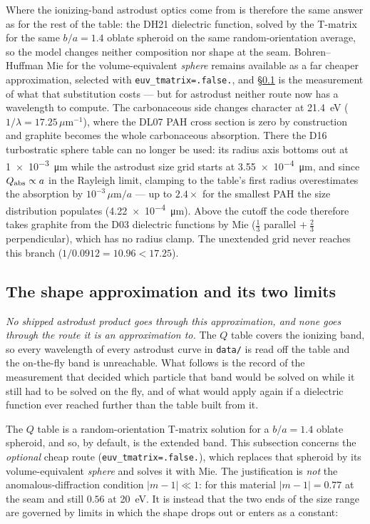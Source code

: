 \documentclass{my_memo}
\begin{document}
\medskip
\noindent Where the ionizing-band astrodust optics come from is therefore the
same answer as for the rest of the table: the DH21 dielectric function,
solved by the T-matrix for the same $b/a = 1.4$ oblate spheroid on the
same random-orientation average, so the model changes neither
composition nor shape at the seam. Bohren--Huffman Mie for the
volume-equivalent \emph{sphere} remains available as a far cheaper
approximation, selected with \texttt{euv\_tmatrix=.false.}, and
\S\ref{sec:euv-shape} is the measurement of what that substitution
costs --- but for astrodust neither route now has a wavelength to
compute. The carbonaceous
side changes character at \SI{21.4}{\electronvolt}
($1/\lambda = 17.25\,\mu\mathrm{m}^{-1}$), where the DL07 PAH cross
section is zero by construction and graphite becomes the whole
carbonaceous absorption. There the D16 turbostratic sphere table can no
longer be used: its radius axis bottoms out at
\SI{1e-3}{\micro\meter} while the astrodust size grid starts at
\SI{3.55e-4}{\micro\meter}, and since $Q_{\rm abs}\propto a$ in the
Rayleigh limit, clamping to the table's first radius overestimates the
absorption by $10^{-3}\,\mu\mathrm{m}/a$ --- up to $2.4\times$ for the
smallest PAH the size distribution populates
(\SI{4.22e-4}{\micro\meter}). Above the cutoff the code therefore takes
graphite from the D03 dielectric functions by Mie
($\tfrac13$ parallel $+\ \tfrac23$ perpendicular), which has no radius
clamp. The unextended grid never reaches this branch
($1/0.0912 = 10.96 < 17.25$).

\subsection{The shape approximation and its two limits}
\label{sec:euv-shape}

\emph{No shipped astrodust product goes through this approximation, and
none goes through the route it is an approximation to.} The $Q$ table
covers the ionizing band, so every wavelength of every astrodust curve
in \texttt{data/} is read off the table and the on-the-fly band is
unreachable. What follows is the record of the measurement that decided
which particle that band would be solved on while it still had to be
solved on the fly, and of what would apply again if a dielectric
function ever reached further than the table built from it.

\medskip
\noindent The $Q$ table is a random-orientation T-matrix solution for a
$b/a = 1.4$ oblate spheroid, and so, by default, is the extended band.
This subsection concerns the \emph{optional} cheap route
(\texttt{euv\_tmatrix=.false.}), which replaces that spheroid by its
volume-equivalent \emph{sphere} and solves it with Mie. The
justification is \emph{not} the
anomalous-diffraction condition $|m-1|\ll1$: for this material
$|m-1| = 0.77$ at the seam and still $0.56$ at
\SI{20}{\electronvolt}. It is instead that the two ends of the size
range are governed by limits in which the shape drops out or enters as
a constant:
\end{document}
